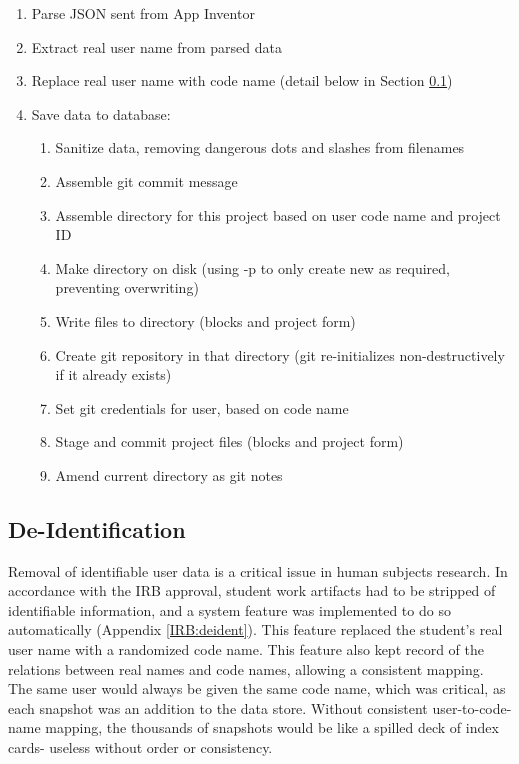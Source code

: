 \begin{enumerate}
\item Parse JSON sent from App Inventor
\item Extract real user name from parsed data
\item Replace real user name with code name (detail below in Section \ref{sec:deident})
\item Save data to database:
\begin{enumerate}
	\item Sanitize data, removing dangerous dots and slashes from filenames
	\item Assemble git commit message
	\item Assemble directory for this project based on user code name and project ID
	\item Make directory on disk (using -p to only create new as required, preventing overwriting)
	\item Write files to directory (blocks and project form)
	\item Create git repository in that directory (git re-initializes non-destructively if it already exists)
	\item Set git credentials for user, based on code name
	\item Stage and commit project files (blocks and project form)
	\item Amend current directory as git notes
\end{enumerate}
\end{enumerate}

\subsection{De-Identification}
\label{sec:deident}
Removal of identifiable user data is a critical issue in human subjects research. In accordance with the IRB approval, student work artifacts had to be stripped of identifiable information, and a system feature was implemented to do so automatically (Appendix \ref{IRB:deident}). This feature replaced the student's real user name with a randomized code name. This feature also kept record of the relations between real names and code names, allowing a consistent mapping. The same user would always be given the same code name, which was critical, as each snapshot was an addition to the data store. Without consistent user-to-code-name mapping, the thousands of snapshots would be like a spilled deck of index cards- useless without order or consistency. 


